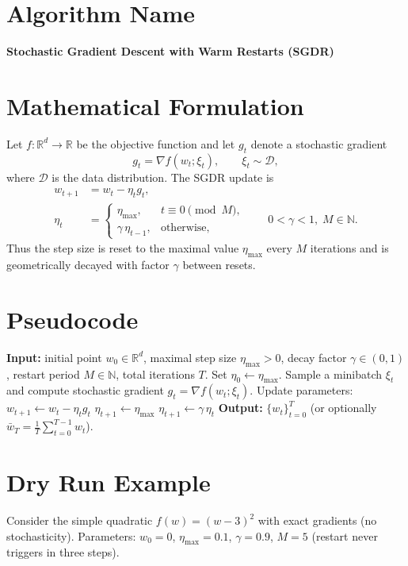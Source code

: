 \documentclass[11pt]{article}
\newcommand{\R}{\mathbb{R}}
\begin{document}
\section*{Algorithm Name}
\textbf{Stochastic Gradient Descent with Warm Restarts (SGDR)}

\section*{Mathematical Formulation}
Let $f:\R^{d}\rightarrow\R$ be the objective function and let $g_t$ denote a stochastic gradient
\[
g_t=\nabla f(w_t; \xi_t),\qquad \xi_t\sim\mathcal{D},
\]
where $\mathcal{D}$ is the data distribution.  
The SGDR update is
\begin{align}
w_{t+1}&=w_t-\eta_t g_t, \label{eq:update}\\[4pt]
\eta_t&=
\begin{cases}
\eta_{\max}, & t\equiv 0\pmod M,\\[4pt]
\gamma\,\eta_{t-1}, & \text{otherwise},
\end{cases}\qquad 0<\gamma<1,\; M\in\mathbb{N}. \label{eq:schedule}
\end{align}
Thus the step size is reset to the maximal value $\eta_{\max}$ every $M$ iterations and is geometrically decayed with factor $\gamma$ between resets.

\section*{Pseudocode}
\begin{algorithm}[H]
\caption{SGDR}
\begin{algorithmic}[1]
\State \textbf{Input:} initial point $w_0\in\R^{d}$, maximal step size $\eta_{\max}>0$, decay factor $\gamma\in(0,1)$, restart period $M\in\mathbb N$, total iterations $T$.
\State Set $\eta_0\gets\eta_{\max}$.
    \State Sample a minibatch $\xi_t$ and compute stochastic gradient $g_t=\nabla f(w_t;\xi_t)$.
    \State Update parameters: $w_{t+1}\gets w_t-\eta_t g_t$ 
        \State $\eta_{t+1}\gets\eta_{\max}$ 
    \Else
        \State $\eta_{t+1}\gets\gamma\,\eta_{t}$ 
    \EndIf
\EndFor
\State \textbf{Output:} $\{w_t\}_{t=0}^{T}$ (or optionally $\bar w_T=\frac1T\sum_{t=0}^{T-1}w_t$).
\end{algorithmic}
\end{algorithm}

\section*{Dry Run Example}
Consider the simple quadratic $f(w)=(w-3)^2$ with exact gradients (no stochasticity).  
Parameters: $w_0=0$, $\eta_{\max}=0.1$, $\gamma=0.9$, $M=5$ (restart never triggers in three steps).  
\end{document}
